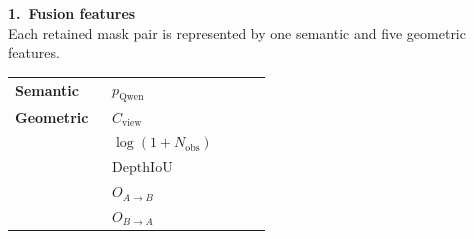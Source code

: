 \documentclass[a0,landscape]{a0poster}
\begin{document}
\begin{minipage}[t]{0.425\linewidth}
\begin{milestonebox}[height=265mm]
\begin{minipage}[t]{0.24\linewidth}
{\large\bfseries\textcolor{accent}{1.\ Fusion features}}\\[2mm]

{\small
Each retained mask pair is represented by one semantic and five
geometric features.}

\vspace{2mm}

\begin{tcolorbox}[
  colback=tumpale!45!white,
  colframe=tumlight,
  boxrule=1pt,
  arc=3mm,
  left=4mm,
  right=4mm,
  top=3mm,
  bottom=3mm
]

\normalsize
\renewcommand{\arraystretch}{1.48}

\begin{tabular}{
@{}
>{\raggedright\arraybackslash}p{0.34\linewidth}
>{\centering\arraybackslash}p{0.56\linewidth}
@{}
}

\textcolor{tumblue}{\bfseries Semantic}
&
$p_{\mathrm{Qwen}}$
\\[1mm]

\textcolor{accent}{\bfseries Geometric}
&
$C_{\mathrm{view}}$
\\

&
$\log(1+N_{\mathrm{obs}})$
\\

&
$\mathrm{DepthIoU}$
\\

&
$O_{A\rightarrow B}$
\\

&
$O_{B\rightarrow A}$
\\

\end{tabular}

\end{tcolorbox}

\vspace{2mm}





\end{minipage}
\end{milestonebox}
\end{minipage}
\end{document}
